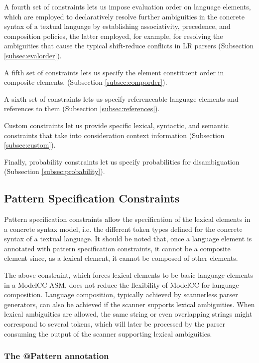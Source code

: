 \documentclass[a4paper,twoside,onecolumn]{article}
\begin{document}
A fourth set of constraints lets us impose evaluation order on language elements, which are employed to declaratively resolve further ambiguities in the concrete syntax of a textual language by establishing associativity, precedence, and composition policies, the latter employed, for example, for resolving the ambiguities that cause the typical shift-reduce conflicts in LR parsers (Subsection \ref{subsec:evalorder}).

A fifth set of constraints lets us specify the element constituent order in composite elements. (Subsection \ref{subsec:comporder}).

A sixth set of constraints lets us specify referenceable language elements and references to them (Subsection \ref{subsec:references}).

Custom constraints let us provide specific lexical, syntactic, and semantic constraints that take into consideration context information (Subsection \ref{subsec:custom}).

Finally, probability constraints let us specify probabilities for disambiguation (Subsection \ref{subsec:probability}).

\subsection{Pattern Specification Constraints} \label{subsec:patterns}

Pattern specification constraints allow the specification of the lexical elements in a concrete syntax model, i.e. the different token types defined for the concrete syntax of a textual language.
It should be noted that, once a language element is annotated with pattern specification constraints, it cannot be a composite element since, as a lexical element, it cannot be composed of other elements.

The above constraint, which forces lexical elements to be basic language elements in a ModelCC ASM, does not reduce the flexibility of ModelCC for language composition.
Language composition, typically achieved by scannerless parser generators, can also be achieved if the scanner supports lexical ambiguities.
When lexical ambiguities are allowed, the same string or even overlapping strings might correspond to several tokens, which will later be processed by the parser consuming the output of the scanner supporting lexical ambiguities.

\subsubsection{The @Pattern annotation}
\end{document}
